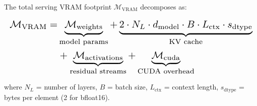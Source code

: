 \documentclass[11pt,a4paper]{article}
\begin{document}
The total serving VRAM footprint $\mathcal{M}_{\text{VRAM}}$ decomposes as:



























\begin{equation}
\resizebox{\columnwidth}{!}{$\displaystyle
\begin{aligned}
\mathcal{M}_{\text{VRAM}} = & \underbrace{\mathcal{M}_{\text{weights}}}_{\text{model params}} + \underbrace{2 \cdot N_L \cdot d_{\text{model}} \cdot B \cdot L_{\text{ctx}} \cdot s_{\text{dtype}}}_{\text{KV cache}} \\
& + \underbrace{\mathcal{M}_{\text{activations}}}_{\text{residual streams}} + \underbrace{\mathcal{M}_{\text{cuda}}}_{\text{CUDA overhead}}
\end{aligned}
$}
\end{equation}



























where $N_L$ = number of layers, $B$ = batch size, $L_{\text{ctx}}$ = context length, $s_{\text{dtype}}$ = bytes per element (2 for bfloat16).

\begin{table}[htbp]
\centering
\caption{KV Cache Memory at Various Context Lengths ($N_L = 80$, $d_{\text{model}} = 8192$, $B = 1$, bfloat16)}
\end{table}
\end{document}
